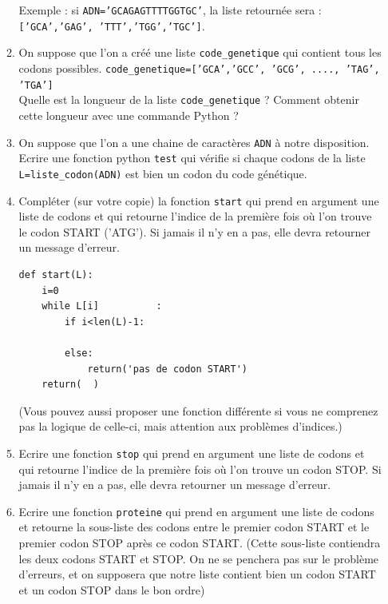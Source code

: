 \begin{exercice}[Informatique]
\begin{enumerate}
\begin{enumerate}
Exemple : si \texttt{ADN='GCAGAGTTTTGGTGC'}, la liste retournée sera :
\texttt{['GCA','GAG', 'TTT','TGG','TGC']}.\\
 
 \item On suppose que l'on a  créé une liste \texttt{code\_genetique} qui contient tous les codons possibles. \texttt{code\_genetique=['GCA','GCC', 'GCG', ...., 'TAG', 'TGA']}\\
 
Quelle est la longueur de la liste \texttt{code\_genetique} ? Comment obtenir cette longueur avec une commande Python ? \\

\item On suppose que l'on a une chaine de caractères \texttt{ADN} à notre disposition. 
Ecrire une fonction python \texttt{test} qui vérifie si chaque codons de la liste \texttt{L=liste\_codon(ADN)} est bien un codon du code génétique. \\

\item Compléter (sur votre copie) la fonction \texttt{start} qui prend en argument une liste de codons et qui retourne  l'indice de la première fois où l'on trouve le codon START ('ATG'). Si jamais il n'y en a pas, elle devra retourner un message d'erreur. \\ 
\begin{lstlisting}
def start(L):
    i=0
    while L[i]          :
        if i<len(L)-1:
            
        else:
            return('pas de codon START')
    return(  )
\end{lstlisting}

(Vous pouvez aussi proposer une fonction différente si vous ne comprenez pas la logique de celle-ci, mais attention aux problèmes d'indices.) 

\item Ecrire une fonction \texttt{stop} qui prend en argument une liste de codons et qui retourne  l'indice de la première fois où l'on trouve un codon STOP. Si jamais il n'y en a pas, elle devra retourner un message d'erreur. \\

\item Ecrire une fonction \texttt{proteine} qui prend en argument une liste de codons et  retourne la sous-liste des codons entre   le premier codon START et le premier codon STOP après ce codon START.  (Cette sous-liste contiendra les deux codons START et STOP. On ne  se penchera pas sur le problème d'erreurs, et on supposera que  notre liste contient bien un codon START et un codon STOP dans le bon ordre)   \\
\end{enumerate}







\end{enumerate}
\end{exercice}
